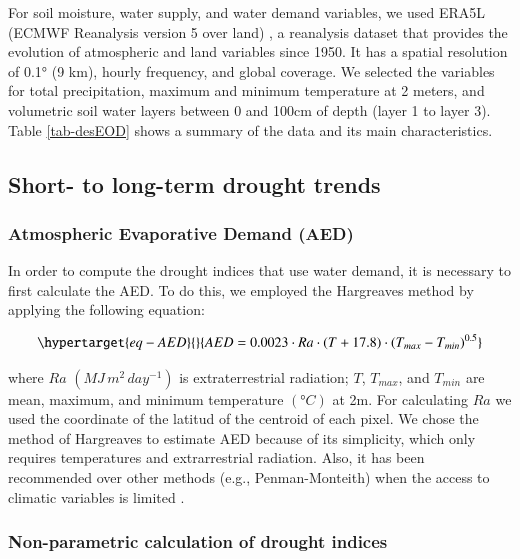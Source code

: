 \documentclass[
  authoryear,
  preprint,
  3p,
  onecolumn]{elsarticle}
\begin{document}
For soil moisture, water supply, and water demand variables, we used
ERA5L (ECMWF Reanalysis version 5 over land) \citep{MunozSabater2021}, a
reanalysis dataset that provides the evolution of atmospheric and land
variables since 1950. It has a spatial resolution of 0.1° (9 km), hourly
frequency, and global coverage. We selected the variables for total
precipitation, maximum and minimum temperature at 2 meters, and
volumetric soil water layers between 0 and 100cm of depth (layer 1 to
layer 3). Table \ref{tab-desEOD} shows a summary of the data and its
main characteristics.

\hypertarget{short--to-long-term-drought-trends}{%
\subsection{Short- to long-term drought
trends}\label{short--to-long-term-drought-trends}}

\hypertarget{atmospheric-evaporative-demand-aed}{%
\subsubsection{Atmospheric Evaporative Demand
(AED)}\label{atmospheric-evaporative-demand-aed}}

In order to compute the drought indices that use water demand, it is
necessary to first calculate the AED. To do this, we employed the
Hargreaves method \citep{Hargreaves1994, Hargreaves1985} by applying the
following equation:

\begin{equation}\protect\hypertarget{eq-AED}{}{AED = 0.0023\cdot Ra\cdot (T+17.8)\cdot (T_{max}-T_{min})^{0.5}}\label{eq-AED}\end{equation}

where \(Ra\) \((MJ\,m^2\, day^{-1})\) is extraterrestrial radiation;
\(T\), \(T_{max}\), and \(T_{min}\) are mean, maximum, and minimum
temperature \((°C)\) at 2m. For calculating \(Ra\) we used the
coordinate of the latitud of the centroid of each pixel. We chose the
method of Hargreaves to estimate AED because of its simplicity, which
only requires temperatures and extrarrestrial radiation. Also, it has
been recommended over other methods (e.g., Penman-Monteith) when the
access to climatic variables is limited \citep{Vicente-Serrano2014}.

\hypertarget{non-parametric-calculation-of-drought-indices}{%
\subsubsection{Non-parametric calculation of drought
indices}\label{non-parametric-calculation-of-drought-indices}}
\end{document}
